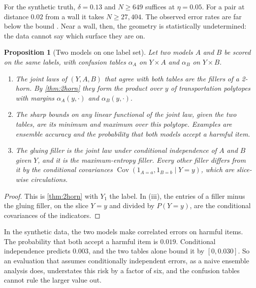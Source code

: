 \documentclass[11pt]{article}
\newtheorem{proposition}[theorem]{Proposition}
\theoremstyle{definition}
\theoremstyle{remark}
\begin{document}
For the synthetic truth, $\delta=0.13$ and $N\ge649$ suffices at $\eta=0.05$. For a pair at distance $0.02$ from a wall it
takes $N\ge27{,}404$. The observed error rates are far below the bound \cite[\S15]{Awasthi-Family}. Near a wall, then, the
geometry is statistically undetermined: the data cannot say which surface they are on.

\begin{proposition}[Two models on one label set]\label{prop:twomodels}
Let two models $A$ and $B$ be scored on the same labels, with confusion tables $\alpha_A$ on $Y\times A$ and $\alpha_B$ on $Y\times B$.
\begin{enumerate}[label=(\roman*)]
\item The joint laws of $(Y,A,B)$ that agree with both tables are the fillers of a 2-horn. By \cref{thm:2horn} they form
  the product over $y$ of transportation polytopes with margins $\alpha_A(y,\cdot)$ and $\alpha_B(y,\cdot)$.
\item The sharp bounds on any linear functional of the joint law, given the two tables, are its minimum and maximum
  over this polytope. Examples are ensemble accuracy and the probability that both models accept a harmful item.
\item The gluing filler is the joint law under conditional independence of $A$ and $B$ given $Y$, and it is the
  maximum-entropy filler. Every other filler differs from it by the conditional covariances
  $\operatorname{Cov}(1_{A=a},1_{B=b}\mid Y=y)$, which are slice-wise circulations.
\end{enumerate}
\end{proposition}
\begin{proof}
This is \cref{thm:2horn} with $Y_1$ the label. In (iii), the entries of a filler minus the gluing filler, on the slice $Y=y$
and divided by $P(Y=y)$, are the conditional covariances of the indicators.
\end{proof}

In the synthetic data, the two models make correlated errors on harmful items. The probability that both accept a harmful
item is $0.019$. Conditional independence predicts $0.003$, and the two tables alone bound it by $[0,0.030]$. So an
evaluation that assumes conditionally independent errors, as a naive ensemble analysis does, understates this risk by
a factor of six, and the confusion tables cannot rule the larger value out.
\end{document}
